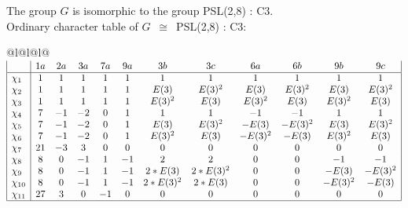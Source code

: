 \documentclass[varwidth=\maxdimen,border=10]{standalone}
\begin{document}
The group $G$ is isomorphic to the group PSL(2,8) : C3.\\
Ordinary character table of $G$\ $\cong$\ PSL(2,8) : C3:\\
\begin{center}
\begin{tabular}{@{}l@{}l@{}l@{}}
\hline
\(\begin{array}{|l|ccccccccccc|}
  & 1a & 2a & 3a & 7a & 9a & 3b & 3c & 6a & 6b & 9b & 9c\\ \hline
\chi_{1} & 1 & 1 & 1 & 1 & 1 & 1 & 1 & 1 & 1 & 1 & 1\\
\chi_{2} & 1 & 1 & 1 & 1 & 1 & E(3) & E(3)^{2} & E(3) & E(3)^{2} & E(3) & E(3)^{2}\\
\chi_{3} & 1 & 1 & 1 & 1 & 1 & E(3)^{2} & E(3) & E(3)^{2} & E(3) & E(3)^{2} & E(3)\\
\chi_{4} & 7 & -1 & -2 & 0 & 1 & 1 & 1 & -1 & -1 & 1 & 1\\
\chi_{5} & 7 & -1 & -2 & 0 & 1 & E(3) & E(3)^{2} & -E(3) & -E(3)^{2} & E(3) & E(3)^{2}\\
\chi_{6} & 7 & -1 & -2 & 0 & 1 & E(3)^{2} & E(3) & -E(3)^{2} & -E(3) & E(3)^{2} & E(3)\\
\chi_{7} & 21 & -3 & 3 & 0 & 0 & 0 & 0 & 0 & 0 & 0 & 0\\
\chi_{8} & 8 & 0 & -1 & 1 & -1 & 2 & 2 & 0 & 0 & -1 & -1\\
\chi_{9} & 8 & 0 & -1 & 1 & -1 & 2*E(3) & 2*E(3)^{2} & 0 & 0 & -E(3) & -E(3)^{2}\\
\chi_{10} & 8 & 0 & -1 & 1 & -1 & 2*E(3)^{2} & 2*E(3) & 0 & 0 & -E(3)^{2} & -E(3)\\
\chi_{11} & 27 & 3 & 0 & -1 & 0 & 0 & 0 & 0 & 0 & 0 & 0\\
\hline
\end{array}\)\\
\end{tabular}
\end{center}
\end{document}
